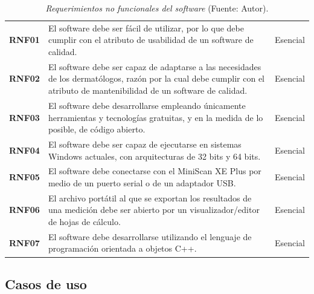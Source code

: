 	\begin{table}[h]
		\small
		\caption[Requerimientos no funcionales del software]{\textit{Requerimientos no funcionales del software} (Fuente: Autor).}
		\centering
		\setlength{\extrarowheight}{\altocelda}
		\begin{tabulary}{\anchotabla}{|c|J|c|}
			\hline
			 &  & \\ \hline
			\textbf{RNF01} & El software debe ser f\'{a}cil de utilizar, por lo que debe cumplir con el atributo de usabilidad de un software de calidad. & Esencial\\ \hline
			\textbf{RNF02} & El software debe ser capaz de adaptarse a las necesidades de los dermat\'{o}logos, raz\'{o}n por la cual debe cumplir con el atributo de mantenibilidad de un software de calidad. & Esencial\\ \hline
			\textbf{RNF03} & El software debe desarrollarse empleando \'{u}nicamente herramientas y tecnolog\'{i}as gratuitas, y en la medida de lo posible, de c\'{o}digo abierto. & Esencial\\ \hline
			\textbf{RNF04} & El software debe ser capaz de ejecutarse en sistemas Windows actuales, con arquitecturas de 32 bits y 64 bits. & Esencial\\ \hline
			\textbf{RNF05} & El software debe conectarse con el MiniScan XE Plus por medio de un puerto serial o de un adaptador USB. & Esencial\\ \hline
			\textbf{RNF06} & El archivo port\'{a}til al que se exportan los resultados de una medici\'{o}n debe ser abierto por un visualizador/editor de hojas de c\'{a}lculo. & Esencial\\ \hline
			\textbf{RNF07} & El software debe desarrollarse utilizando el lenguaje de programaci\'{o}n orientada a objetos C++. & Esencial\\ \hline
		\end{tabulary}
	\end{table}
	
\newpage

\subsection{Casos de uso}

